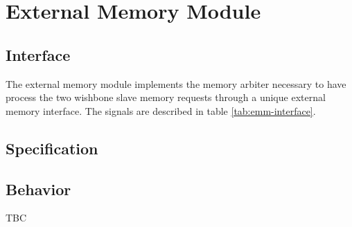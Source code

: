 \section{External Memory Module}

  \subsection{Interface}

    \begin{content}
        The external memory module implements the memory arbiter necessary to have process the two wishbone slave memory requests through a unique external memory interface. The signals are described in table \ref{tab:emm-interface}. 
      \end{content}

    

  \subsection{Specification}


  \subsection{Behavior}

    \begin{content}
        TBC
      \end{content}

\newpage
